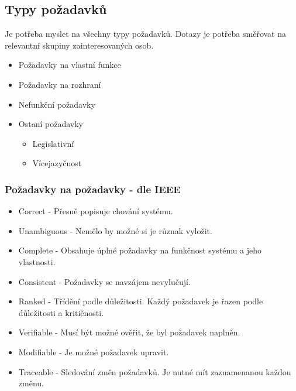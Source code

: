   \subsection{Typy požadavků}
    Je potřeba myslet na všechny typy požadavků.
    Dotazy je potřeba směřovat na relevantní skupiny zainteresovaných osob.
    \begin{itemize}
      \item Požadavky na vlastní funkce
      \item Požadavky na rozhraní
      \item Nefunkční požadavky
      \item Ostaní požadavky
        \begin{itemize}
          \item Legislativní
          \item Vícejazyčnost
        \end{itemize}
    \end{itemize}

    \subsubsection{Požadavky na požadavky - dle IEEE}
      \begin{itemize}
        \item Correct - Přesně popisuje chování systému.
        \item Unambiguous - Nemělo by možné si je různak vyložit.
        \item Complete - Obsahuje úplné požadavky na funkčnost systému a jeho vlastnosti.
        \item Consistent - Požadavky se navzájem nevylučují.
        \item Ranked - Třídění podle důležitosti. Každý požadavek je řazen podle důležitosti a kritičnosti.
        \item Verifiable - Musí být možné ověřit, že byl požadavek naplněn.
        \item Modifiable - Je možné požadavek upravit.
        \item Traceable - Sledování změn požadavků. Je nutné mít zaznamenanou každou změnu.
      \end{itemize}
